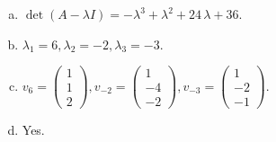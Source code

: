\begin{questions}
\begin{solution}
\begin{enumerate}[(a)]
\item $\det(A-\lambda I)=-{\lambda}^{3} + {\lambda}^{2} + 24 \, {\lambda} + 36$.
\item ${\lambda}_1=6, {\lambda}_2=-2, {\lambda}_3=-3$.
\item $v_{6}=\left(\begin{array}{r}
1 \\
1 \\
2
\end{array}\right), v_{-2}=\left(\begin{array}{r}
1 \\
-4 \\
-2
\end{array}\right), v_{-3}=\left(\begin{array}{r}
1 \\
-2 \\
-1
\end{array}\right)$.
\item Yes.
\end{enumerate}
\end{solution}

\end{questions}

\newpage


\begin{center}
\end{center}


